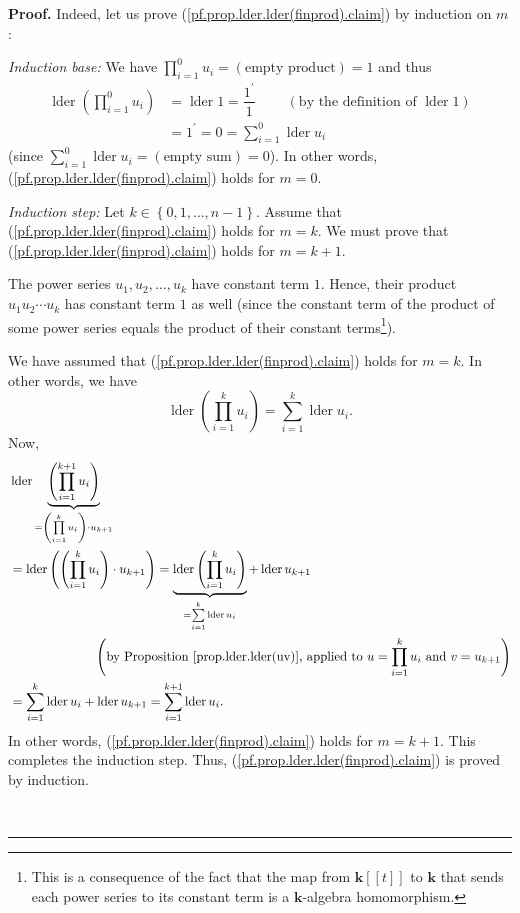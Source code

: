 \documentclass[numbers=enddot,12pt,final,onecolumn,notitlepage]{scrartcl}%
\theoremstyle{definition}
\newenvironment{proof}[1][Proof]{\noindent\textbf{#1.} }{\ \rule{0.5em}{0.5em}}
\let\sumnonlimits\sum
\let\prodnonlimits\prod
\renewcommand{\sum}{\sumnonlimits\limits}
\renewcommand{\prod}{\prodnonlimits\limits}
\newenvironment{verlong}{}{}
\begin{document}
\begin{verlong}
\begin{proof}
Indeed, let us prove (\ref{pf.prop.lder.lder(finprod).claim}) by induction on
$m$:

\textit{Induction base:} We have $\prod_{i=1}^{0}u_{i}=\left(  \text{empty
product}\right)  =1$ and thus%
\begin{align*}
\operatorname*{lder}\left(  \prod_{i=1}^{0}u_{i}\right)   &
=\operatorname*{lder}1=\dfrac{1^{\prime}}{1}\ \ \ \ \ \ \ \ \ \ \left(
\text{by the definition of }\operatorname*{lder}1\right) \\
&  =1^{\prime}=0=\sum_{i=1}^{0}\operatorname*{lder}u_{i}%
\end{align*}
(since $\sum_{i=1}^{0}\operatorname*{lder}u_{i}=\left(  \text{empty
sum}\right)  =0$). In other words, (\ref{pf.prop.lder.lder(finprod).claim})
holds for $m=0$.

\textit{Induction step:} Let $k\in\left\{  0,1,\ldots,n-1\right\}  $. Assume
that (\ref{pf.prop.lder.lder(finprod).claim}) holds for $m=k$. We must prove
that (\ref{pf.prop.lder.lder(finprod).claim}) holds for $m=k+1$.

The power series $u_{1},u_{2},\ldots,u_{k}$ have constant term $1$. Hence,
their product $u_{1}u_{2}\cdots u_{k}$ has constant term $1$ as well (since
the constant term of the product of some power series equals the product of
their constant terms\footnote{This is a consequence of the fact that the map
from $\mathbf{k}\left[  \left[  t\right]  \right]  $ to $\mathbf{k}$ that
sends each power series to its constant term is a $\mathbf{k}$-algebra
homomorphism.}).

We have assumed that (\ref{pf.prop.lder.lder(finprod).claim}) holds for $m=k$.
In other words, we have%
\[
\operatorname*{lder}\left(  \prod_{i=1}^{k}u_{i}\right)  =\sum_{i=1}%
^{k}\operatorname*{lder}u_{i}.
\]
Now,%
\begin{align*}
&  \operatorname*{lder}\underbrace{\left(  \prod_{i=1}^{k+1}u_{i}\right)
}_{=\left(  \prod_{i=1}^{k}u_{i}\right)  \cdot u_{k+1}}\\
&  =\operatorname*{lder}\left(  \left(  \prod_{i=1}^{k}u_{i}\right)  \cdot
u_{k+1}\right)  =\underbrace{\operatorname*{lder}\left(  \prod_{i=1}^{k}%
u_{i}\right)  }_{=\sum_{i=1}^{k}\operatorname*{lder}u_{i}}%
+\operatorname*{lder}u_{k+1}\\
&  \ \ \ \ \ \ \ \ \ \ \ \ \ \ \ \ \ \ \ \ \left(  \text{by Proposition
\ref{prop.lder.lder(uv)}, applied to }u=\prod_{i=1}^{k}u_{i}\text{ and
}v=u_{k+1}\right) \\
&  =\sum_{i=1}^{k}\operatorname*{lder}u_{i}+\operatorname*{lder}u_{k+1}%
=\sum_{i=1}^{k+1}\operatorname*{lder}u_{i}.
\end{align*}
In other words, (\ref{pf.prop.lder.lder(finprod).claim}) holds for $m=k+1$.
This completes the induction step. Thus,
(\ref{pf.prop.lder.lder(finprod).claim}) is proved by induction.


\end{proof}
\end{verlong}
\end{document}
